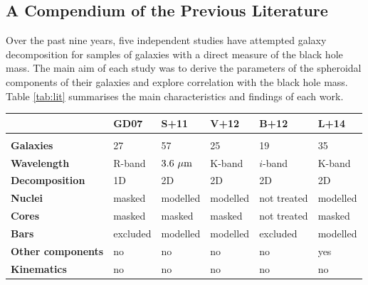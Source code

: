 \subsection{A Compendium of the Previous Literature }
Over the past nine years, five independent studies 
\citep{grahamdriver2007,sani2011,vika2012,beifiori2012,lasker2014data,lasker2014anal}
have attempted galaxy decomposition 
for samples of galaxies with a direct measure of the black hole mass. 
The main aim of each study was to derive the parameters of the spheroidal components of their galaxies 
and explore correlation with the black hole mass.
Table \ref{tab:lit} summarises the main characteristics and findings of each work. 

\begin{table}[ht] 
\footnotesize
\centering 
\begin{tabular}{llllll}
\hline\hline 
		       & {\bf GD07}	 & {\bf S+11}	   & {\bf V+12} & {\bf B+12}  & {\bf L+14} \\ 	      %
\hline \\ [-1.5ex]
{\bf Galaxies }        & 27		 & 57		   & 25 	& 19	      & 35	   \\	      %
{\bf Wavelength }      & R-band 	 & $3.6~\mu \rm m$ & K-band	& $i$-band    & K-band     \\	      %
{\bf Decomposition}    & 1D		 & 2D		   & 2D 	& 2D	      & 2D	   \\	      %
{\bf Nuclei }	       & masked 	 & modelled	   & modelled	& not treated & modelled    \\	      %
{\bf Cores }	       & masked 	 & masked	   & masked	& not treated & masked     \\ 	      %
{\bf Bars }	       & excluded	 & modelled	   & modelled	& excluded    & modelled    \\ 	      %
{\bf Other components} & no		 & no		   & no 	& no	      & yes	   \\ 	      %
{\bf Kinematics}       & no		 & no		   & no 	& no	      & no	   \\ [0.5ex] %

\end{tabular}
\end{table}
